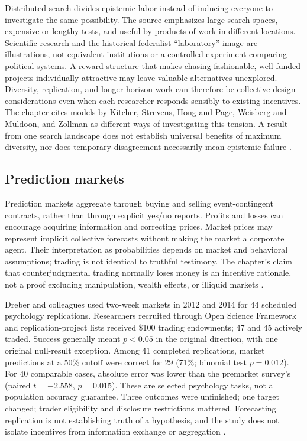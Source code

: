 Distributed search divides epistemic labor instead of inducing everyone
to investigate the same possibility. The source emphasizes large search
spaces, expensive or lengthy tests, and useful by-products of work in
different locations. Scientific research and the historical federalist
``laboratory'' image are illustrations, not equivalent institutions or
a controlled experiment comparing political systems. A reward structure
that makes chasing fashionable, well-funded projects individually
attractive may leave valuable alternatives unexplored. Diversity,
replication, and longer-horizon work can therefore be collective design
considerations even when each researcher responds sensibly to existing
incentives. The chapter cites models by Kitcher, Strevens, Hong and Page,
Weisberg and Muldoon, and Zollman as different ways of investigating this
tension. A result from one search landscape does not establish universal
benefits of maximum diversity, nor does temporary disagreement necessarily
mean epistemic failure
\parencite[pp.~584--585]{DietrichSpiekermann2021Social}.

\subsection{Prediction markets}

Prediction markets aggregate through buying and selling event-contingent
contracts, rather than through explicit yes/no reports. Profits and losses
can encourage acquiring information and correcting prices. Market prices
may represent implicit collective forecasts without making the market a
corporate agent. Their interpretation as probabilities depends on market
and behavioral assumptions; trading is not identical to truthful
testimony. The chapter's claim that counterjudgmental trading normally
loses money is an incentive rationale, not a proof excluding manipulation,
wealth effects, or illiquid markets
\parencite[p.~585]{DietrichSpiekermann2021Social}.

Dreber and colleagues used two-week markets in 2012 and 2014 for
44 scheduled psychology replications. Researchers recruited through
Open Science Framework and replication-project lists received \$100
trading endowments; 47 and 45 actively traded. Success generally meant
\(p<0.05\) in the original direction, with one original null-result
exception. Among 41 completed replications, market predictions at a
50\% cutoff were correct for 29 (71\%; binomial test \(p=0.012\)).
For 40 comparable cases, absolute error was lower than the premarket
survey's (paired \(t=-2.558\), \(p=0.015\)). These are selected
psychology tasks, not a population accuracy guarantee. Three outcomes
were unfinished; one target changed; trader eligibility and disclosure
restrictions mattered. Forecasting replication is not establishing
truth of a hypothesis, and the study does not isolate incentives from
information exchange or aggregation
\parencite[pp.~15343--15346]{DreberEtAl2015ReplicationMarkets}.

